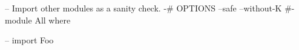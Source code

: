 \begin{code}
-- Import other modules as a sanity check.
{-# OPTIONS --safe --without-K #-}
module All where

-- import Foo
\end{code}
